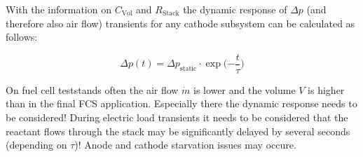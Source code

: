 \documentclass[11pt,a4paper,english,twoside]{scrreprt}
\begin{document}
With the information on $C_\mathrm{Vol}$ and $R_\mathrm{Stack}$ the dynamic response of $\Delta p$ (and therefore also air flow) transients for any cathode subsystem can be calculated as follows:

\begin{equation}
  \label{eqn:dynamicdeltap}
  \Delta p(t) = \Delta p_\mathrm{static} \cdot \exp{(-\frac{t}{\tau}})
\end{equation}




On fuel cell teststands often the air flow $\dot m$ is lower and the volume $V$ is higher than in the final FCS application. Especially there the dynamic response needs to be considered! During electric load transients it needs to be considered that the reactant flows through the stack may be significantly delayed by several seconds (depending on $\tau$)! Anode and cathode starvation issues may occure. 




\end{document}
